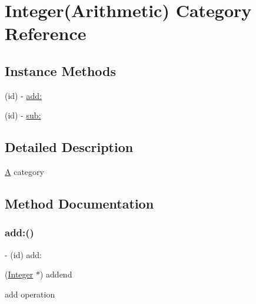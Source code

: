 \hypertarget{category_integer_07_arithmetic_08}{}\section{Integer(Arithmetic) Category Reference}
\label{category_integer_07_arithmetic_08}
\subsection*{Instance Methods}
\begin{DoxyCompactItemize}
\item 
(id) -\/ \mbox{\hyperlink{category_integer_07_arithmetic_08_a12f411c5872ba3bafb8ea7dd1826cf2a}{add\+:}}
\item 
(id) -\/ \mbox{\hyperlink{category_integer_07_arithmetic_08_ae4ff0b0c62b6809e8f5bcee9baa6e521}{sub\+:}}
\end{DoxyCompactItemize}


\subsection{Detailed Description}
\mbox{\hyperlink{class_a}{A}} category 

\subsection{Method Documentation}
\mbox{\label{category_integer_07_arithmetic_08_a12f411c5872ba3bafb8ea7dd1826cf2a}} 
\subsubsection{\texorpdfstring{add:()}{add:()}}
{\footnotesize\ttfamily -\/ (id) add\+: \begin{DoxyParamCaption}\item[{(\mbox{\hyperlink{interface_integer}{Integer}} $\ast$)}]{addend }\end{DoxyParamCaption}}

add operation \mbox{\label{category_integer_07_arithmetic_08_ae4ff0b0c62b6809e8f5bcee9baa6e521}} 
